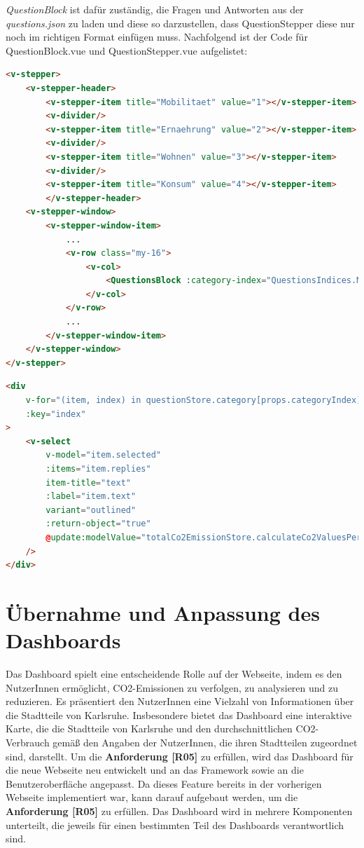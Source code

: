 \textit{QuestionBlock} ist dafür zuständig, die Fragen und Antworten aus der \textit{questions.json} zu laden und diese so darzustellen, dass QuestionStepper diese nur noch im richtigen Format einfügen muss.
Nachfolgend ist der Code für QuestionBlock.vue und QuestionStepper.vue aufgelistet:

\begin{lstlisting}[language={html}, caption={QuestionStepper.vue}]
<v-stepper>
    <v-stepper-header>
        <v-stepper-item title="Mobilitaet" value="1"></v-stepper-item>
        <v-divider/>
        <v-stepper-item title="Ernaehrung" value="2"></v-stepper-item>
        <v-divider/>
        <v-stepper-item title="Wohnen" value="3"></v-stepper-item>
        <v-divider/>
        <v-stepper-item title="Konsum" value="4"></v-stepper-item>
        </v-stepper-header>
    <v-stepper-window>
        <v-stepper-window-item>
            ...
            <v-row class="my-16">
                <v-col>
                    <QuestionsBlock :category-index="QuestionsIndices.MOBILITY"/>
                </v-col>
            </v-row>
            ...
        </v-stepper-window-item>
    </v-stepper-window>
</v-stepper>
\end{lstlisting}

\begin{lstlisting}[language={html}, caption={QuestionBlock.vue}]
<div
    v-for="(item, index) in questionStore.category[props.categoryIndex].questions"
    :key="index"
>
    <v-select
        v-model="item.selected"
        :items="item.replies"
        item-title="text"
        :label="item.text"
        variant="outlined"
        :return-object="true"
        @update:modelValue="totalCo2EmissionStore.calculateCo2ValuesPerCategory()"
    />
</div>
\end{lstlisting}

\section{Übernahme und Anpassung des Dashboards}

Das Dashboard spielt eine entscheidende Rolle auf der Webseite, indem es den NutzerInnen ermöglicht, CO2-Emissionen zu verfolgen, zu analysieren und zu reduzieren. Es präsentiert den NutzerInnen eine Vielzahl von Informationen über die Stadtteile von Karlsruhe. Insbesondere bietet das Dashboard eine interaktive Karte, die die Stadtteile von Karlsruhe und den durchschnittlichen CO2-Verbrauch gemäß den Angaben der NutzerInnen, die ihren Stadtteilen zugeordnet sind, darstellt. Um die \textbf{Anforderung [R05]} zu erfüllen, wird das Dashboard für die neue Webseite neu entwickelt und an das Framework sowie an die Benutzeroberfläche angepasst. Da dieses Feature bereits in der vorherigen Webseite implementiert war, kann darauf aufgebaut werden, um die \textbf{Anforderung [R05]} zu erfüllen. Das Dashboard wird in mehrere Komponenten unterteilt, die jeweils für einen bestimmten Teil des Dashboards verantwortlich sind.

